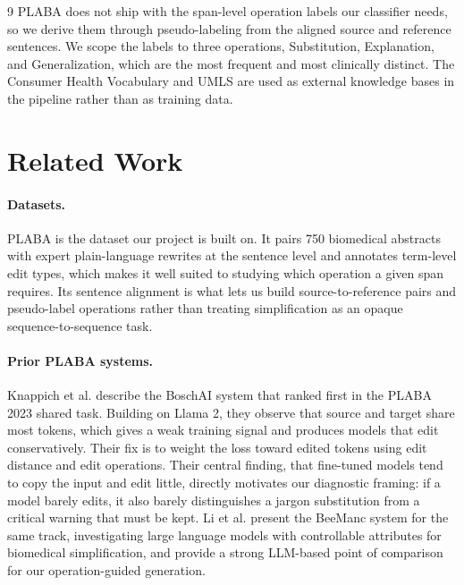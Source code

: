\documentclass[11pt]{article}
\begin{document}
\begin{thebibliography}{9}
PLABA does not ship with the span-level operation labels our classifier needs,
so we derive them through pseudo-labeling from the aligned source and reference
sentences. We scope the labels to three operations, Substitution, Explanation,
and Generalization, which are the most frequent and most clinically distinct.
The Consumer Health Vocabulary and UMLS are used as external knowledge bases in
the pipeline rather than as training data.

\section{Related Work}

\paragraph{Datasets.}
PLABA \cite{attal2023plaba} is the dataset our project is built on. It pairs 750
biomedical abstracts with expert plain-language rewrites at the sentence level
and annotates term-level edit types, which makes it well suited to studying
which operation a given span requires. Its sentence alignment is what lets us
build source-to-reference pairs and pseudo-label operations rather than treating
simplification as an opaque sequence-to-sequence task.

\paragraph{Prior PLABA systems.}
Knappich et al. \cite{knappich2023boschai} describe the BoschAI system that
ranked first in the PLABA 2023 shared task. Building on Llama 2, they observe
that source and target share most tokens, which gives a weak training signal and
produces models that edit conservatively. Their fix is to weight the loss toward
edited tokens using edit distance and edit operations. Their central finding,
that fine-tuned models tend to copy the input and edit little, directly
motivates our diagnostic framing: if a model barely edits, it also barely
distinguishes a jargon substitution from a critical warning that must be kept.
Li et al. \cite{li2024beemanc} present the BeeManc system for the same track,
investigating large language models with controllable attributes for biomedical
simplification, and provide a strong LLM-based point of comparison for our
operation-guided generation.


\end{thebibliography}
\end{document}
